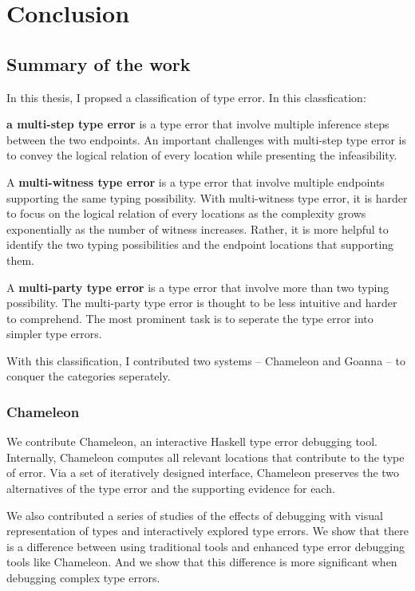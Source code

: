 


\chapter{Conclusion}

\label{chap:conclusion} 
\graphicspath{{Figures/Conclusion}}

\section{Summary of the work}
In this thesis, I propsed a classification of type error. In this classfication:

\textbf{a multi-step type error} is a type error that involve multiple inference steps between the two endpoints. An important challenges with multi-step type error is to convey the logical relation of every location while presenting the infeasibility. 

A \textbf{multi-witness type error} is a type error that involve multiple endpoints supporting the same typing possibility. With multi-witness type error, it is harder to focus on the logical relation of every locations as the complexity grows exponentially as the number of witness increases. Rather, it is more helpful to identify the two typing possibilities and the endpoint locations that supporting them.

A \textbf{multi-party type error} is a type error that involve more than two typing possibility. The multi-party type error is thought to be less intuitive and harder to comprehend. The most prominent task is to seperate the type error into simpler type errors. 

With this classification, I contributed two systems -- Chameleon and Goanna -- to conquer the categories seperately.


\subsection{Chameleon}
We contribute Chameleon, an interactive Haskell type error debugging tool. Internally, Chameleon computes all relevant locations that contribute to the type of error. Via a set of iteratively designed interface, Chameleon preserves the two alternatives of the type error and the supporting evidence for each.

We also contributed a series of studies of the effects of debugging with visual representation of types and interactively explored type errors. We show that there is a difference between using traditional tools and enhanced type error debugging tools like Chameleon. And we show that this difference is more significant when debugging complex type errors.

